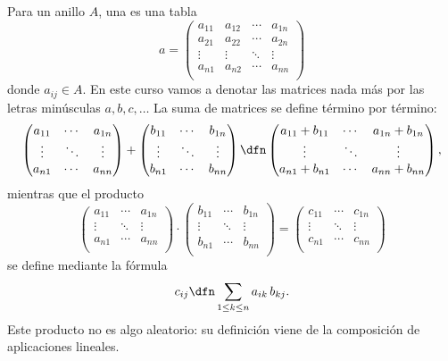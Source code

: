 \begin{ejemplo}
  Para un anillo $A$, una 
  es una tabla
  \[ a = \begin{pmatrix}
      a_{11} & a_{12} & \cdots & a_{1n} \\
      a_{21} & a_{22} & \cdots & a_{2n} \\
      \vdots & \vdots & \ddots & \vdots \\
      a_{n1} & a_{n2} & \cdots & a_{nn} \\
    \end{pmatrix} \]
  donde $a_{ij} \in A$. En este curso vamos a denotar las matrices nada más por
  las letras minúsculas $a, b, c, \ldots$ La suma de matrices se define término
  por término:
  \[ \begin{pmatrix}
      a_{11} & \cdots & a_{1n} \\
      \vdots & \ddots & \vdots \\
      a_{n1} & \cdots & a_{nn} \\
    \end{pmatrix} +
    \begin{pmatrix}
      b_{11} & \cdots & b_{1n} \\
      \vdots & \ddots & \vdots \\
      b_{n1} & \cdots & b_{nn} \\
    \end{pmatrix} \dfn
    \begin{pmatrix}
      a_{11} + b_{11} & \cdots & a_{1n} + b_{1n} \\
      \vdots & \ddots & \vdots \\
      a_{n1} + b_{n1} & \cdots & a_{nn} + b_{nn} \\
    \end{pmatrix}, \]
  mientras que el producto
  \[ \begin{pmatrix}
      a_{11} & \cdots & a_{1n} \\
      \vdots & \ddots & \vdots \\
      a_{n1} & \cdots & a_{nn} \\
    \end{pmatrix} \cdot \begin{pmatrix}
      b_{11} & \cdots & b_{1n} \\
      \vdots & \ddots & \vdots \\
      b_{n1} & \cdots & b_{nn} \\
    \end{pmatrix} =
    \begin{pmatrix}
      c_{11} & \cdots & c_{1n} \\
      \vdots & \ddots & \vdots \\
      c_{n1} & \cdots & c_{nn} \\
    \end{pmatrix} \]
  se define mediante la fórmula
  $$c_{ij} \dfn \sum_{1 \le k \le n} a_{ik}\,b_{kj}.$$
  Este producto no es algo aleatorio: su definición viene de la composición de
  aplicaciones lineales.


\end{ejemplo}
